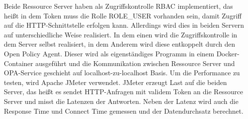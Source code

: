 Beide Ressource Server haben als Zugriffskontrolle \ac{RBAC} 
implementiert, das heißt in dem Token muss die Rolle ROLE\_USER vorhanden sein, damit 
Zugriff auf die HTTP-Schnittstelle erfolgen kann. Allerdings wird dies in beiden Servern auf 
unterschiedliche Weise realisiert. In dem einen wird die Zugriffskontrolle in dem Server 
selbst realisiert, in dem Anderem wird diese entkoppelt durch den Open Policy Agent. 
Dieser wird als eigenständiges Programm in einem Docker-Container ausgeführt und die 
Kommunikation zwischen Ressource Server und OPA-Service geschieht auf localhost-zu-localhost Basis. 
Um die Performance zu testen, wird Apache JMeter verwendet. JMeter erzeugt Last auf die 
beiden Server, das heißt es sendet HTTP-Anfragen mit validem Token an die Ressource 
Server und misst die Latenzen der Antworten. Neben der Latenz wird auch die Response 
Time und Connect Time gemessen und der Datendurchsatz berechnet.